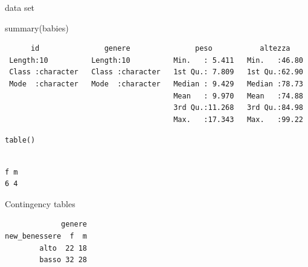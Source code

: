 \documentclass[
  ignorenonframetext,
]{beamer}
\newenvironment{Shaded}{\begin{snugshade}}{\end{snugshade}}
\newcommand{\AttributeTok}[1]{\textcolor[rgb]{0.00,0.34,0.68}{#1}}
\newcommand{\CommentTok}[1]{\textcolor[rgb]{0.54,0.53,0.53}{#1}}
\newcommand{\FunctionTok}[1]{\textcolor[rgb]{0.39,0.29,0.61}{#1}}
\newcommand{\NormalTok}[1]{\textcolor[rgb]{0.12,0.11,0.11}{#1}}
\newcommand{\OtherTok}[1]{\textcolor[rgb]{0.00,0.43,0.16}{#1}}
\newcommand{\SpecialCharTok}[1]{\textcolor[rgb]{0.24,0.68,0.91}{#1}}
\newcommand{\StringTok}[1]{\textcolor[rgb]{0.75,0.01,0.01}{#1}}
\begin{document}
\begin{frame}[fragile]{data set}
\protect\hypertarget{data-set}{}
\begin{Shaded}
\begin{Highlighting}[]
\FunctionTok{summary}\NormalTok{(babies)}
\end{Highlighting}
\end{Shaded}

\begin{verbatim}
      id               genere               peso           altezza     
 Length:10          Length:10          Min.   : 5.411   Min.   :46.80  
 Class :character   Class :character   1st Qu.: 7.809   1st Qu.:62.90  
 Mode  :character   Mode  :character   Median : 9.429   Median :78.73  
                                       Mean   : 9.970   Mean   :74.88  
                                       3rd Qu.:11.268   3rd Qu.:84.98  
                                       Max.   :17.343   Max.   :99.22  
\end{verbatim}
\end{frame}

\begin{frame}[fragile]{\texttt{table()}}
\protect\hypertarget{table}{}
\begin{Shaded}
\end{Shaded}

\begin{verbatim}

f m 
6 4 
\end{verbatim}
\end{frame}

\begin{frame}[fragile]{Contingency tables}
\protect\hypertarget{contingency-tables}{}
\small

\begin{Shaded}
\end{Shaded}

\begin{verbatim}
             genere
new_benessere  f  m
        alto  22 18
        basso 32 28
\end{verbatim}
\end{frame}
\end{document}
